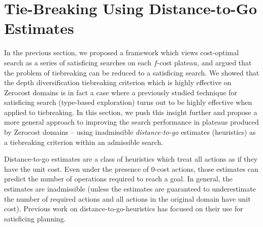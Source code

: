\section{Tie-Breaking Using Distance-to-Go Estimates}

\label{sec:distance-to-go}
In the previous section, we proposed a framework which views cost-optimal \astar search as a series of satisficing searches on each $f$-cost plateau, and argued that 
the problem of tiebreaking can be reduced to a satisficing search.
We showed that the depth diversification tiebreaking criterion which is highly effective on Zerocost domains is in fact a case where a previously studied technique for satisficing search (type-based exploration) turns out to be highly effective when applied to tiebreaking.
In this section, we push this insight further and propose a more general approach to improving the
search performance in plateaus produced by Zerocost domains --
using inadmissible \emph{distance-to-go} estimates (heuristics) as a tiebreaking criterion within an admissible \astar search.



Distance-to-go estimates are a class of
heuristics which treat all actions as if they have the unit cost. Even under
the presence of 0-cost actions, those estimates can predict the
number of operations required to reach a goal.
In general, the estimates are inadmissible (unless the estimates are guaranteed to underestimate the number of required actions and all actions in the original domain have unit cost).
Previous work on distance-to-go-heuristics has focused on 
their use for satisficing planning.


